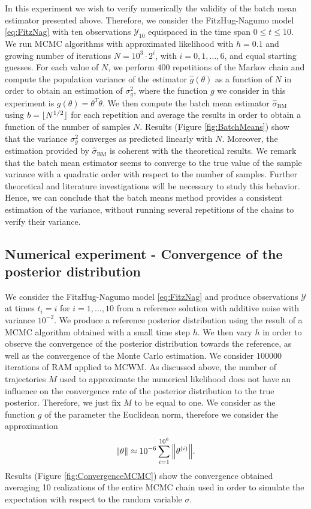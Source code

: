 In this experiment we wish to verify numerically the validity of the batch mean estimator presented above. Therefore, we consider the FitzHug-Nagumo model \eqref{eq:FitzNag} with ten observations $\mathcal{Y}_{10}$ equispaced in the time span $0 \leq t \leq 10$. We run MCMC algorithms with approximated likelihood with $h = 0.1$ and growing number of iterations $N = 10^3 \cdot 2^i$, with $i = 0, 1, \ldots, 6$, and equal starting guesses. For each value of $N$, we perform $400$ repetitions of the Markov chain and compute the population variance of the estimator $\hat g(\theta)$ as a function of $N$ in order to obtain an estimation of $\sigma^2_g$, where the function $g$ we consider in this experiment is $g(\theta) = \theta^T\theta$. We then compute the batch mean estimator $\hat \sigma_{\mathrm{BM}}$ using $b = \lfloor N^{1/2}\rfloor$ for each repetition and average the results in order to obtain a function of the number of samples $N$. Results (Figure \ref{fig:BatchMeans}) show that the variance $\sigma^2_g$ converges as predicted linearly with $N$. Moreover, the estimation provided by $\hat \sigma_{\mathrm{BM}}$ is coherent with the theoretical results. We remark that the batch mean estimator seems to converge to the true value of the sample variance with a quadratic order with respect to the number of samples. Further theoretical and literature investigations will be necessary to study this behavior. Hence, we can conclude that the batch means method provides a consistent estimation of the variance, without running several repetitions of the chains to verify their variance.


\subsection{Numerical experiment - Convergence of the posterior distribution}

We consider the FitzHug-Nagumo model \eqref{eq:FitzNag} and produce observations $\mathcal{Y}$ at times $t_i = i$ for $i = 1, \ldots, 10$ from a reference solution with additive noise with variance $10^{-2}$. We produce a reference posterior distribution using the result of a MCMC algorithm obtained with a small time step $h$. We then vary $h$ in order to observe the convergence of the posterior distribution towards the reference, as well as the convergence of the Monte Carlo estimation. We consider $100000$ iterations of RAM applied to MCWM. As discussed above, the number of trajectories $M$ used to approximate the numerical likelihood does not have an influence on the convergence rate of the posterior distribution to the true posterior. Therefore, we just fix $M$ to be equal to one. We consider as the function $g$ of the parameter the Euclidean norm, therefore we consider the approximation
\begin{equation}
	\norm{\theta} \approx 10^{-6} \sum_{i = 1}^{10^6} \norm{\theta^{(i)}}.
\end{equation}
Results	(Figure \ref{fig:ConvergenceMCMC}) show the convergence obtained averaging 10 realizations of the entire MCMC chain used in order to simulate the expectation with respect to the random variable $\sigma$.

